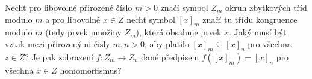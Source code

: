 Nechť pro libovolné přirozené číslo $m>0$ značí symbol $Z_{m}$ okruh zbytkových
tříd modulo $m$ a pro libovolné $x \in Z$ nechť symbol $\left [ x \right ]_{m}$
značí tu třídu kongruence modulo $m$ (tedy prvek množiny $Z_{m}$), která
obsahuje prvek $x$. Jaký musí být vztak mezi přirozenými čisly $m,n>0$, aby
platilo $\left [ x \right ]_{m} \subseteq \left [ x \right ]_{n}$ pro všechna 
$z \in Z$? Je pak zobrazení $f:Z_{m} \rightarrow Z_{n}$ dané předpisem $f(\left [ x
\right ]_{m}) =\left [ x \right ]_{n}$ pro všechna $x \in Z$ homomorfismus?
